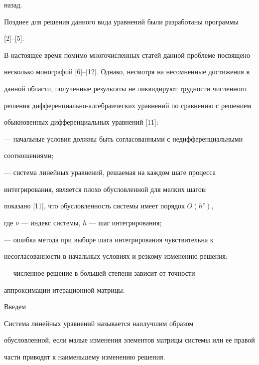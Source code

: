 назад.





Позднее для решения данного вида уравнений были разработаны программы


[2]--[5].


В настоящее время помимо многочисленных статей данной проблеме посвящено


несколько монографий [6]--[12]. Однако, несмотря на несомненные достижения в


данной области, полученные результаты не ликвидируют трудности численного


решения дифференциально-алгебраических уравнений по сравнению с решением


обыкновенных дифференциальных уравнений [11]:





--- начальные условия должны быть согласованными с недифференциальными


соотношениями;





--- система линейных уравнений, решаемая на каждом шаге процесса


интегрирования, является плохо обусловленной для мелких шагов;


показано [11], что обусловленность системы имеет порядок $O(h^\nu)$,


где $\nu$ --- индекс системы, $h$ --- шаг интегрирования;





--- ошибка метода при выборе шага интегрирования чувствительна к


несогласованности в начальных условиях и резкому изменению решения;





--- численное решение в большей степени зависит от точности


аппроксимации итерационной матрицы.





Введем





\begin{defn} Система линейных уравнений называется наилучшим образом


обусловленной, если малые изменения элементов матрицы системы или ее правой


части приводят к наименьшему изменению решения.


\end{defn}





